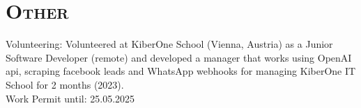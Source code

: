 \section{\textsc{Other}}


Volunteering: Volunteered at KiberOne School (Vienna, Austria) as a Junior Software Developer (remote) and developed a manager that works using OpenAI api, scraping facebook leads and WhatsApp webhooks for managing KiberOne IT School for 2 months (2023). \\
\newline
Work Permit until: 25.05.2025

